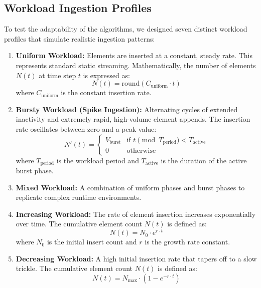 \subsection{Workload Ingestion Profiles}
To test the adaptability of the algorithms, we designed seven distinct workload 
profiles that simulate realistic ingestion patterns:
\begin{enumerate}
    \item \textbf{Uniform Workload:} Elements are inserted at a constant, steady 
    rate. This represents standard static streaming. Mathematically, the 
    number of elements $N(t)$ at time step $t$ is expressed as:
    \begin{equation}
        N(t) = \text{round}(C_{\text{uniform}} \cdot t)
    \end{equation}
    where $C_{\text{uniform}}$ is the constant insertion rate.
    \item \textbf{Bursty Workload (Spike Ingestion):} Alternating cycles of 
    extended inactivity and extremely rapid, high-volume element appends. The 
    insertion rate oscillates between zero and a peak value:
    \begin{equation}
        N'(t) = \begin{cases} 
            V_{\text{burst}} & \text{if } t \pmod{T_{\text{period}}} < T_{\text{active}} \\
            0 & \text{otherwise}
        \end{cases}
    \end{equation}
    where $T_{\text{period}}$ is the workload period and $T_{\text{active}}$ is the 
    duration of the active burst phase.
    \item \textbf{Mixed Workload:} A combination of uniform phases and burst phases 
    to replicate complex runtime environments.
    \item \textbf{Increasing Workload:} The rate of element insertion increases 
    exponentially over time. The cumulative element count $N(t)$ is defined as:
    \begin{equation}
        N(t) = N_0 \cdot e^{r \cdot t}
    \end{equation}
    where $N_0$ is the initial insert count and $r$ is the growth rate constant.
    \item \textbf{Decreasing Workload:} A high initial insertion rate that 
    tapers off to a slow trickle. The cumulative element count $N(t)$ is defined as:
    \begin{equation}
        N(t) = N_{\max} \cdot \left(1 - e^{-r \cdot t}\right)

\end{equation}
\end{enumerate}
